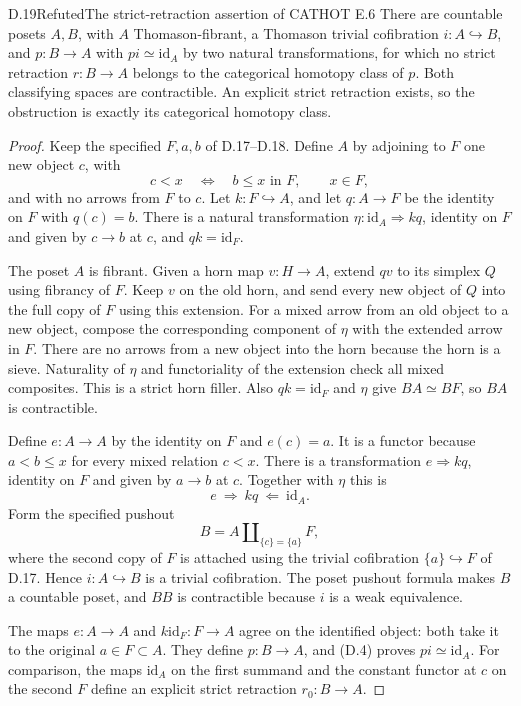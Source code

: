 \begin{claim}{D.19}{Refuted}{The strict-retraction assertion of CATHOT E.6}
There are countable posets $A,B$, with $A$ Thomason-fibrant, a Thomason trivial cofibration $i:A\hookrightarrow B$, and $p:B\to A$ with $pi\simeq\mathrm{id}_A$ by two natural transformations, for which no strict retraction $r:B\to A$ belongs to the categorical homotopy class of $p$. Both classifying spaces are contractible. An explicit strict retraction exists, so the obstruction is exactly its categorical homotopy class.
\end{claim}
\begin{proof}
Keep the specified $F,a,b$ of D.17--D.18. Define $A$ by adjoining to $F$ one new object $c$, with
\[
 c<x\quad\Longleftrightarrow\quad b\le x\text{ in }F,
 \qquad x\in F,
\]
and with no arrows from $F$ to $c$. Let $k:F\hookrightarrow A$, and let $q:A\to F$ be the identity on $F$ with $q(c)=b$. There is a natural transformation $\eta:\mathrm{id}_A\Rightarrow kq$, identity on $F$ and given by $c\to b$ at $c$, and $qk=\mathrm{id}_F$.

The poset $A$ is fibrant. Given a horn map $v:H\to A$, extend $qv$ to its simplex $Q$ using fibrancy of $F$. Keep $v$ on the old horn, and send every new object of $Q$ into the full copy of $F$ using this extension. For a mixed arrow from an old object to a new object, compose the corresponding component of $\eta$ with the extended arrow in $F$. There are no arrows from a new object into the horn because the horn is a sieve. Naturality of $\eta$ and functoriality of the extension check all mixed composites. This is a strict horn filler. Also $qk=\mathrm{id}_F$ and $\eta$ give $BA\simeq BF$, so $BA$ is contractible.

Define $e:A\to A$ by the identity on $F$ and $e(c)=a$. It is a functor because $a<b\le x$ for every mixed relation $c<x$. There is a transformation $e\Rightarrow kq$, identity on $F$ and given by $a\to b$ at $c$. Together with $\eta$ this is
\[
 e\ \Longrightarrow\ kq\ \Longleftarrow\ \mathrm{id}_A.
 \tag{D.4}
\]
Form the specified pushout
\[
 B=A\amalg_{\{c\}=\{a\}}F,
\]
where the second copy of $F$ is attached using the trivial cofibration $\{a\}\hookrightarrow F$ of D.17. Hence $i:A\hookrightarrow B$ is a trivial cofibration. The poset pushout formula makes $B$ a countable poset, and $BB$ is contractible because $i$ is a weak equivalence.

The maps $e:A\to A$ and $k\mathrm{id}_F:F\to A$ agree on the identified object: both take it to the original $a\in F\subset A$. They define $p:B\to A$, and (D.4) proves $pi\simeq\mathrm{id}_A$. For comparison, the maps $\mathrm{id}_A$ on the first summand and the constant functor at $c$ on the second $F$ define an explicit strict retraction $r_0:B\to A$.


\end{proof}
